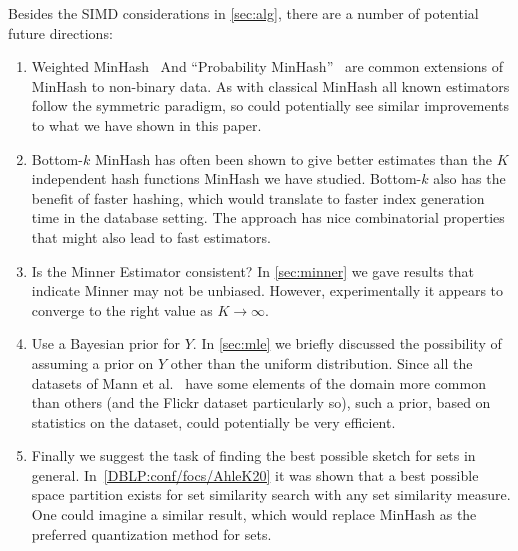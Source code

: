 Besides the SIMD considerations in \cref{sec:alg}, there are a number of potential future directions:
\begin{enumerate}
   \item Weighted MinHash~\cite{ioffe2010improved} And ``Probability MinHash''~\cite{moulton2018maximally} are common extensions of MinHash to non-binary data.
      As with classical MinHash all known estimators follow the symmetric paradigm, so could potentially see similar improvements to what we have shown in this paper.
   \item Bottom-$k$ MinHash has often been shown to give better estimates than the $K$ independent hash functions MinHash we have studied.
      Bottom-$k$ also has the benefit of faster hashing, which would translate to faster index generation time in the database setting.
      The approach has nice combinatorial properties that might also lead to fast estimators.
   \item Is the Minner Estimator consistent? In \cref{sec:minner} we gave results that indicate Minner may not be unbiased.
      However, experimentally it appears to converge to the right value as $K\to\infty$.
   \item Use a Bayesian prior for $Y$.
      In \cref{sec:mle} we briefly discussed the possibility of assuming a prior on $Y$ other than the uniform distribution.
      Since all the datasets of Mann et al.~\cite{mann2016empirical} have some elements of the domain more common than others (and the Flickr dataset particularly so), such a prior, based on statistics on the dataset, could potentially be very efficient.
   \item Finally we suggest the task of finding the best possible sketch for sets in general.
      In~\cref{DBLP:conf/focs/AhleK20} it was shown that a best possible space partition exists for set similarity search with any set similarity measure.
      One could imagine a similar result, which would replace MinHash as the preferred quantization method for sets.
\end{enumerate}



